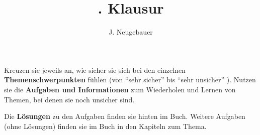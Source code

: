 \documentclass[11pt, a4paper]{scrartcl}
\author{J. Neugebauer}
\title{\Nummer. Klausur}
\date{\Heute}
\begin{document}
\CheckupBild\CheckupTitel

Kreuzen sie jeweils an, wie sicher sie sich bei den einzelnen \textbf{Themenschwerpunkten} fühlen (von \enquote{sehr sicher}  bis \enquote{sehr unsicher} ). Nutzen sie die \textbf{Aufgaben und Informationen} zum Wiederholen und Lernen von Themen, bei denen sie noch unsicher sind.

Die \textbf{Lösungen} zu den Aufgaben finden sie hinten im Buch. Weitere Aufgaben (ohne Lösungen) finden sie im Buch in den Kapiteln zum Thema.

\begin{checkup}
\end{checkup}
\end{document}
